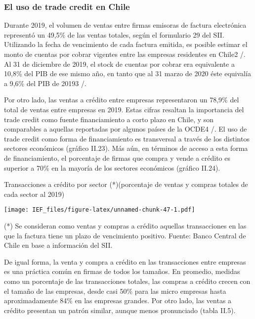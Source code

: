 \documentclass[
]{book}
\begin{document}
\hypertarget{REC2.12}{%
\subsubsection*{\texorpdfstring{\textbf{El uso de trade credit en Chile}}{El uso de trade credit en Chile}}\label{REC2.12}}

Durante 2019, el volumen de ventas entre firmas emisoras de
factura electrónica representó un 49,5\% de las ventas totales,
según el formulario 29 del SII. Utilizando la fecha de vencimiento
de cada factura emitida, es posible estimar el monto de cuentas
por cobrar vigentes entre las empresas residentes en Chile2
/. Al
31 de diciembre de 2019, el stock de cuentas por cobrar era
equivalente a 10,8\% del PIB de ese mismo año, en tanto que
al 31 marzo de 2020 éste equivalía a 9,6\% del PIB de 20193
/.

Por otro lado, las ventas a crédito entre empresas representaron
un 78,9\% del total de ventas entre empresas en 2019. Estas
cifras resaltan la importancia del trade credit como fuente
financiamiento a corto plazo en Chile, y son comparables a
aquellas reportadas por algunos países de la OCDE4
/.
El uso de trade credit como forma de financiamiento es transversal
a través de los distintos sectores económicos (gráfico II.23). Más
aún, en términos de acceso a esta forma de financiamiento, el
porcentaje de firmas que compra y vende a crédito es superior
a 70\% en la mayoría de los sectores económicos (gráfico II.24).

Transacciones a crédito por sector (*)(porcentaje de ventas y compras totales de cada sector al 2019)

\texttt{[image: IEF\_files/figure-latex/unnamed-chunk-47-1.pdf]}

(*) Se consideran como ventas y compras a crédito aquellas transacciones en las que la factura tiene un plazo de vencimiento positivo.
Fuente: Banco Central de Chile en base a información del SII.

De igual forma, la venta y compra a crédito en las transacciones
entre empresas es una práctica común en firmas de todos los
tamaños. En promedio, medidas como un porcentaje de las
transacciones totales, las compras a crédito crecen con el tamaño
de las empresas, desde casi 50\% para las micro empresas hasta
aproximadamente 84\% en las empresas grandes. Por otro lado,
las ventas a crédito presentan un patrón similar, aunque menos
pronunciado (tabla II.5).
\end{document}
